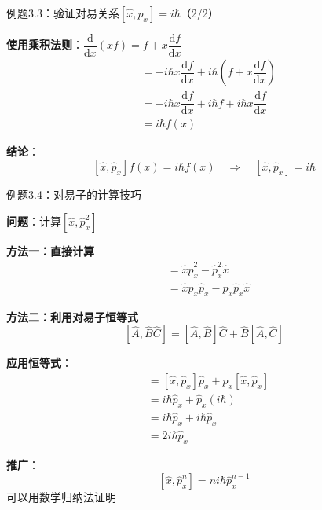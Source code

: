 \begin{frame}{例题3.3：验证对易关系$[\hat{x}, \hat{p}_x] = i\hbar$（2/2）}

  \begin{iqbitemize}
    \item \textbf{使用乘积法则}：$\dfrac{\mathrm{d}}{\mathrm{d}x}(xf) = f + x\dfrac{\mathrm{d}f}{\mathrm{d}x}$
    \begin{align*}
      &= -i\hbar x\dfrac{\mathrm{d}f}{\mathrm{d}x} + i\hbar\left(f + x\dfrac{\mathrm{d}f}{\mathrm{d}x}\right) \\
      &= -i\hbar x\dfrac{\mathrm{d}f}{\mathrm{d}x} + i\hbar f + i\hbar x\dfrac{\mathrm{d}f}{\mathrm{d}x} \\
      &= i\hbar f(x)
    \end{align*}

    \item \textbf{结论}：
    \[
      [\hat{x}, \hat{p}_x]f(x) = i\hbar f(x) \quad \Rightarrow \quad [\hat{x}, \hat{p}_x] = i\hbar
    \]
  \end{iqbitemize}

\end{frame}

\begin{frame}{例题3.4：对易子的计算技巧}

  \textbf{问题}：计算$[\hat{x}, \hat{p}_x^2]$

  \begin{iqbitemize}
    \item \textbf{方法一：直接计算}
    \begin{align*}
      [\hat{x}, \hat{p}_x^2] &= \hat{x}\hat{p}_x^2 - \hat{p}_x^2\hat{x} \\
      &= \hat{x}\hat{p}_x\hat{p}_x - \hat{p}_x\hat{p}_x\hat{x}
    \end{align*}

    \item \textbf{方法二：利用对易子恒等式}
    \[
      [\hat{A}, \hat{B}\hat{C}] = [\hat{A}, \hat{B}]\hat{C} + \hat{B}[\hat{A}, \hat{C}]
    \]

    \item \textbf{应用恒等式}：
    \begin{align*}
      [\hat{x}, \hat{p}_x^2] &= [\hat{x}, \hat{p}_x]\hat{p}_x + \hat{p}_x[\hat{x}, \hat{p}_x] \\
      &= i\hbar\hat{p}_x + \hat{p}_x(i\hbar) \\
      &= i\hbar\hat{p}_x + i\hbar\hat{p}_x \\
      &= 2i\hbar\hat{p}_x
    \end{align*}

    \item \textbf{推广}：
    \[
      [\hat{x}, \hat{p}_x^n] = ni\hbar\hat{p}_x^{n-1}
    \]
    可以用数学归纳法证明
  \end{iqbitemize}

\end{frame}
